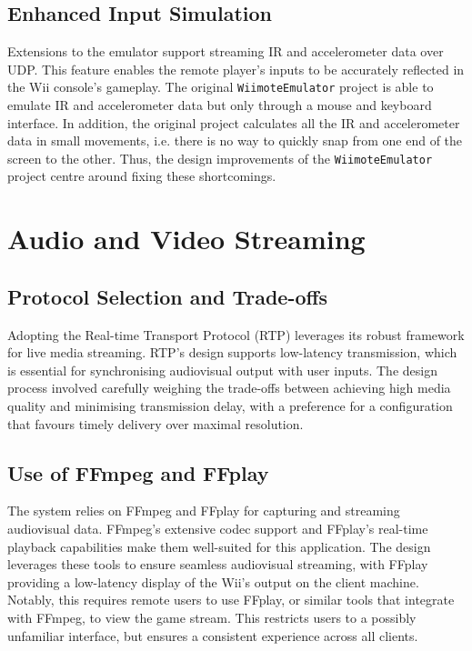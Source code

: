 \subsection{Enhanced Input Simulation}
 Extensions to the emulator support streaming IR and accelerometer data over UDP. This feature enables the remote player’s inputs to be accurately reflected in the Wii console’s gameplay. The original \texttt{WiimoteEmulator} project is able to emulate IR and accelerometer data but only through a mouse and keyboard interface. In addition, the original project calculates all the IR and accelerometer data in small movements, i.e. there is no way to quickly snap from one end of the screen to the other. Thus, the design improvements of the \texttt{WiimoteEmulator} project centre around fixing these shortcomings.

\section{Audio and Video Streaming}

\subsection{Protocol Selection and Trade-offs}
Adopting the Real-time Transport Protocol (RTP) leverages its robust framework for live media streaming. RTP’s design supports low-latency transmission, which is essential for synchronising audiovisual output with user inputs. The design process involved carefully weighing the trade-offs between achieving high media quality and minimising transmission delay, with a preference for a configuration that favours timely delivery over maximal resolution.

\subsection{Use of FFmpeg and FFplay}
The system relies on FFmpeg\cite{wikipediaFFmpeg} and FFplay\cite{ffplay} for capturing and streaming audiovisual data. FFmpeg’s extensive codec support and FFplay’s real-time playback capabilities make them well-suited for this application. The design leverages these tools to ensure seamless audiovisual streaming, with FFplay providing a low-latency display of the Wii’s output on the client machine. Notably, this requires remote users to use FFplay, or similar tools that integrate with FFmpeg, to view the game stream. This restricts users to a possibly unfamiliar interface, but ensures a consistent experience across all clients.

